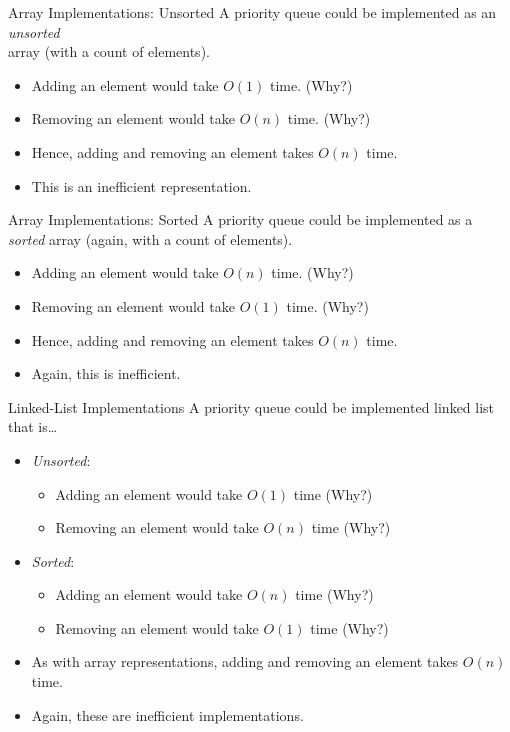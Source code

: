 \documentclass[14pt, aspectratio=1610]{beamer}
\begin{document}
\begin{frame}{Array Implementations: Unsorted}
  A priority queue could be implemented as an \emph{unsorted}\\ array (with a count of elements).
  \pause{}
  \begin{itemize}[<+->]
    \item
      Adding an element would take \(O(1)\) time. (Why?)
    \item
      Removing an element would take \(O(n)\) time. (Why?)
    \item
      Hence, adding and removing an element takes \(O(n)\) time.
    \item
      This is an inefficient representation.
  \end{itemize}
\end{frame}

\begin{frame}{Array Implementations: Sorted}
  A priority queue could be implemented as a \emph{sorted} array (again, with a count of elements).
  \pause{}
  \begin{itemize}[<+->]
  \item
    Adding an element would take \(O(n)\) time. (Why?)
  \item
    Removing an element would take \(O(1)\) time. (Why?)
  \item
    Hence, adding and removing an element takes \(O(n)\) time.
  \item
    Again, this is inefficient.
  \end{itemize}
\end{frame}

\begin{frame}{Linked-List Implementations}
  A priority queue could be implemented linked list that is\ldots{}
\begin{itemize}[<+->]
\item
  \emph{Unsorted}:
  \begin{itemize}
  \item
    Adding an element would take \(O(1)\) time (Why?)
  \item
    Removing an element would take \(O(n)\) time (Why?)
  \end{itemize}
\item
  \emph{Sorted}:
  \begin{itemize}
  \item
    Adding an element would take \(O(n)\) time (Why?)
  \item
    Removing an element would take \(O(1)\) time (Why?)
  \end{itemize}
\item
  As with array representations, adding and removing an element takes \(O(n)\) time.
\item
  Again, these are inefficient implementations.
\end{itemize}
\end{frame}
\end{document}
